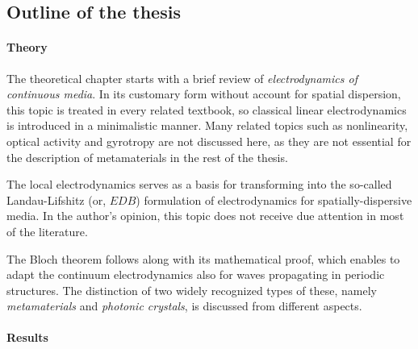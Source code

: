 
\subsection{Outline of the thesis} %

\paragraph{Theory} %
The theoretical chapter starts with a brief review of \textit{electrodynamics of continuous media}. In its customary form without account for spatial dispersion, this topic is treated in every related textbook, so classical linear electrodynamics is introduced in a minimalistic manner. Many related topics such as nonlinearity, optical activity and gyrotropy are not discussed here, as they are not essential for the description of metamaterials in the rest of the thesis.  

The local electrodynamics serves as a basis for transforming into the so-called Landau-Lifshitz (or, $EDB$) formulation of electrodynamics for spatially-dispersive media. 
In the author's opinion, this topic does not receive due attention in most of the literature.

The Bloch theorem follows along with its mathematical proof, which enables to adapt the continuum electrodynamics also for waves propagating in periodic structures. 
The distinction of two widely recognized types of these, namely \textit{metamaterials} and \textit{photonic crystals}, is discussed from different aspects. 

\paragraph{Results} %

